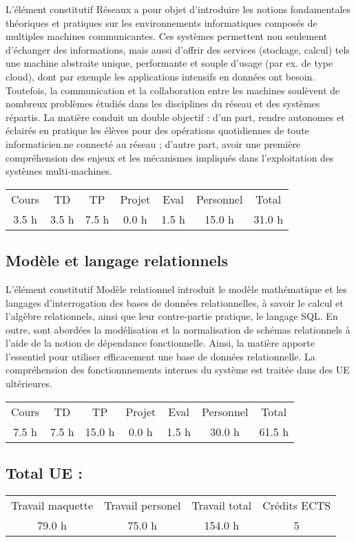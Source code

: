 %
L'élément constitutif Réseaux a pour objet d’introduire les notions fondamentales théoriques et pratiques sur les environnements informatiques composés de multiples machines communicantes. Ces systèmes permettent non seulement d'échanger des informations, mais aussi d'offrir des services (stockage, calcul) tels une machine abstraite unique, performante et souple d'usage (par ex. de type cloud), dont par exemple les applications intensifs en données ont besoin. Toutefois, la communication et la collaboration entre les machines soulèvent de nombreux problèmes étudiés dans les disciplines du réseau et des systèmes répartis. La matière conduit un double objectif : d'un part, rendre autonomes et éclairés en pratique les élèves pour des opérations quotidiennes de toute informaticien.ne connecté au réseau ; d'autre part, avoir une première compréhension des enjeux et les mécanismes impliqués dans l'exploitation des systèmes multi{-}machines.%
\begin{longtable}{c c c c c c c}%
\hline%
Cours&TD&TP&Projet&Eval&Personnel&Total\\%
3.5 h&3.5 h&7.5 h&0.0 h&1.5 h&15.0 h&31.0 h\\%
\hline%
\end{longtable}%
\subsection{Modèle et langage relationnels}%
\label{subsec:Modleetlangagerelationnels}%

%
L'élément constitutif Modèle relationnel introduit le modèle mathématique et les langages d’interrogation des bases de données relationnelles, à savoir le calcul et l’algèbre relationnels, ainsi que leur contre{-}partie pratique, le langage SQL. En outre, sont abordées la modélisation et la normalisation de schémas relationnels à l’aide de la notion de dépendance fonctionnelle. Ainsi, la matière apporte l'essentiel pour utiliser efficacement une base de données relationnelle. La compréhension des fonctionnnements internes du système est traitée dans des UE ultérieures.%
\begin{longtable}{c c c c c c c}%
\hline%
Cours&TD&TP&Projet&Eval&Personnel&Total\\%
7.5 h&7.5 h&15.0 h&0.0 h&1.5 h&30.0 h&61.5 h\\%
\hline%
\end{longtable}%
\subsection{Total UE :}%
\label{subsec:TotalUE}%

%
\begin{longtable}{c c c c}%
\hline%
Travail maquette&Travail personel&Travail total&Crédits ECTS\\%
79.0 h&75.0 h&154.0 h&5\\%
\hline%
\end{longtable}